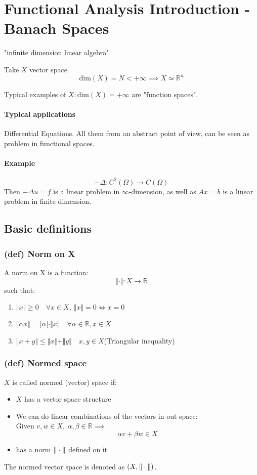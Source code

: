 \section{Functional Analysis Introduction - Banach Spaces}

\begin{center}
    "infinite dimension linear algebra"
\end{center}

Take $X$ vector space.
$$\text{dim}(X)=N<+\infty \implies X\simeq \mathbb R^n$$

Typical examples of $X:\text{dim} (X)=+\infty$ are "function spaces".

\paragraph{Typical applications} Differential Equations. All them from an abstract point of view, can be seen as problem in functional spaces.

\paragraph{Example}
$$-\Delta : C^2(\Omega ) \to C(\Omega)$$
Then $-\Delta u = f$ is a linear problem in $\infty$-dimension, as well as $A\bar x = \bar b$ is a linear problem in finite dimension.
\subsection{Basic definitions}
\subsubsection{(def) Norm on X}
A norm on X is a function:
$$\Vert \cdot\Vert :X\to \mathbb R$$
such that:
\begin{enumerate}
    \item $\Vert x\Vert \geq 0\quad \forall x\in X,\ \Vert x\Vert =0\iff x=0$
    \item $\Vert \alpha x \Vert = |\alpha|\cdot \Vert x\Vert\quad \forall \alpha \in \mathbb R, x\in X$\
    \item $\Vert x+y \Vert \leq \Vert x\Vert + \Vert y\Vert \quad x,y\in X$\tab (Triangular inequality)
\end{enumerate}
\subsubsection{(def) Normed space}
$X$ is called normed (vector) space if:
\begin{itemize}
    \item $X$ has a vector space structure
    \item We can do linear combinations of the vectors in out space:\\
    Given $v,w\in X,\ \alpha,\beta\in \mathbb R\implies$
    $$\alpha v+\beta w\in X$$
    \item has a norm $\Vert \cdot \Vert$ defined on it
\end{itemize}
The normed vector space is denoted as $(X,\Vert \cdot \Vert)$.
